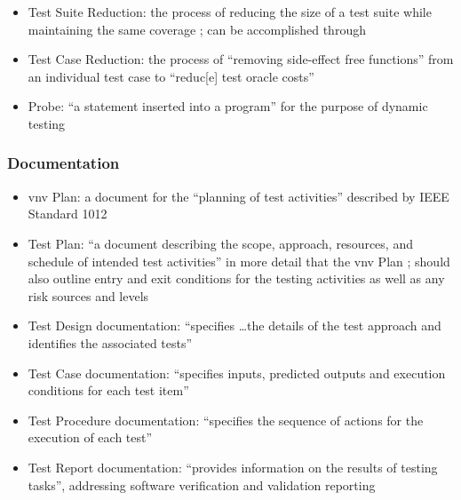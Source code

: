 \begin{itemize}
      \item Test Suite Reduction: the process of reducing the size of a test
            suite while maintaining the same coverage
            \citep[p.~519]{BarrEtAl2015}; can be accomplished through
      \item Test Case Reduction: the process of ``removing side-effect free
            functions'' from an individual test case to ``reduc[e] test oracle
            costs'' \citep[p.~519]{BarrEtAl2015}
      \item Probe: ``a statement inserted into a program'' for the purpose of
            dynamic testing \citep[p.~438]{PetersAndPedrycz2000}
\end{itemize}

\subsubsection{Documentation}

\begin{itemize}
      \item \acf{vnv} Plan: a document for the ``planning of test activities''
            described by IEEE Standard 1012 \citep[p.~411]{vanVliet2000}
      \item Test Plan: ``a document describing the scope, approach, resources,
            and schedule of intended test activities'' in more detail that the
            \acs{vnv} Plan \citep[pp.~412-413]{vanVliet2000};
            should also outline entry and exit conditions for the testing
            activities as well as any risk sources and levels
            \citep[p.~445]{PetersAndPedrycz2000}
      \item Test Design documentation: ``specifies \dots the details of the
            test approach and identifies the associated tests''
            \citep[p.~413]{vanVliet2000}
      \item Test Case documentation: ``specifies inputs, predicted outputs and
            execution conditions for each test item''
            \citep[p.~413]{vanVliet2000}
      \item Test Procedure documentation: ``specifies the sequence of actions
            for the execution of each test'' \citep[p.~413]{vanVliet2000}
      \item Test Report documentation: ``provides information on the results of
            testing tasks'', addressing software verification and validation
            reporting \citep[p.~413]{vanVliet2000}
\end{itemize}

